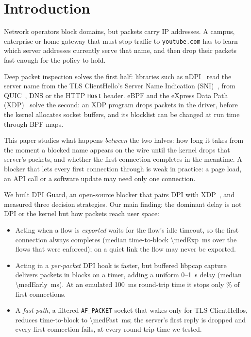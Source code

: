 \documentclass[sigconf,nonacm]{acmart}
\newcommand{\sys}{DPI Guard}
\begin{document}
\maketitle

\section{Introduction}

Network operators block domains, but packets carry IP addresses. A campus, enterprise or home
gateway that must stop traffic to \texttt{youtube.com} has to learn which server addresses
currently serve that name, and then drop their packets fast enough for the policy to hold.

Deep packet inspection solves the first half: libraries such as nDPI~\cite{ndpi} read the
server name from the TLS ClientHello's Server Name Indication (SNI)~\cite{rfc6066,rfc8446},
from QUIC~\cite{rfc9000}, DNS or the HTTP \texttt{Host} header. eBPF and the eXpress Data Path
(XDP)~\cite{xdp} solve the second: an XDP program drops packets in the driver, before the kernel
allocates socket buffers, and its blocklist can be changed at run time through BPF maps.

This paper studies what happens \emph{between} the two halves: how long it takes from the
moment a blocked name appears on the wire until the kernel drops that server's packets, and
whether the first connection completes in the meantime. A blocker that lets every first
connection through is weak in practice: a page load, an API call or a software update may need
only one connection.

We built \sys{}, an open-source blocker that pairs DPI with XDP~\cite{dpiguard}, and measured three
decision strategies. Our main finding: the dominant delay is not DPI or the kernel but how
packets reach user space:
\begin{itemize}
  \item Acting when a flow is \emph{exported} waits for the flow's idle timeout, so the first
        connection always completes (median time-to-block \SI{\medExp}{\milli\second} over the
        flows that were enforced); on a quiet link the flow may never be exported.
  \item Acting in a \emph{per-packet} DPI hook is faster, but buffered libpcap capture delivers
        packets in blocks on a timer, adding a uniform 0--\SI{1}{\second} delay (median
        \SI{\medEarly}{\milli\second}). At an emulated \SI{100}{\milli\second} round-trip time
        it stops only \sweepEarlyhundred\% of first connections.
  \item A \emph{fast path}, a filtered \texttt{AF\_PACKET} socket that wakes only for TLS
        ClientHellos, reduces time-to-block to \SI{\medFast}{\milli\second}; the server's
        first reply is dropped and every first connection fails, at every round-trip time we
        tested.
\end{itemize}
\end{document}

